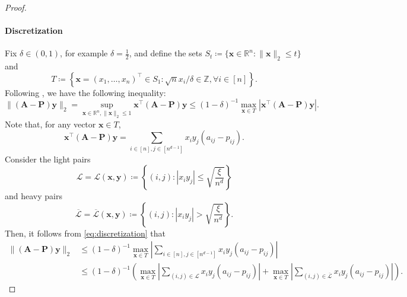 \documentclass{article}
\theoremstyle{plain}
\theoremstyle{definition}
\theoremstyle{remark}
\newcommand{\Br}{\mathbb{R}}
\newcommand{\BP}{\bm{P}}
\newcommand{\BA}{\bm{A}}
\newcommand{\LCal}{\mathcal{L}}
\def\bx{\bm{x}}
\def\by{\bm{y}}
\begin{document}
\begin{appendix}
\begin{center}
\begin{proof}
			\paragraph{Discretization}
			Fix $\delta \in (0,1)$, for example $\delta = \frac{1}{2}$, and define the sets $S_t \coloneqq \{\bx \in \Br^n: \| \bx\|_2 \leq t\}$ and
			\[T \coloneqq \left\{\bx=\left(x_1, \ldots, x_n\right)^\top \in S_1: \sqrt{n} x_i / \delta \in \mathbb{Z}, \forall i\in [n] \right\}.
			\]
			Following \citet[ Supplementary material: Lemma 2.1]{lei2015consistency}, we have the following inequality:
			\begin{equation}\label{eq:discretization}
				\| (\BA - \BP) \by \|_2 = \sup_{\bx \in \Br^n, \| \bx\|_2 \leq 1} \bx^\top (\BA - \BP) \by \leq (1-\delta)^{-1} \max_{\bx \in T} \left|\bx^\top (\BA - \BP) \by \right|.
			\end{equation}
			Note that, for any vector $\bx \in T$,
			\[
			\bx^\top(\BA - \BP) \by=\sum_{i\in [n],  j\in [n^{d-1}]} x_i y_j\left(a_{i j}-p_{i j}\right) .
			\]
			Consider the light pairs
			\[
			\mathcal{L}=\mathcal{L}(\bx, \by) \coloneqq \left\{(i, j):\left|x_i y_j\right| \leq \sqrt{\frac{\xi}{n^{d}}} \right\}
			\]
			and heavy pairs
			\[
			\overline{\mathcal{L}}=\overline{\mathcal{L}}(\bx, \by) \coloneqq \left\{(i, j):\left|x_i y_j\right|>\sqrt{\frac{\xi}{n^{d}}}\right\}.
			\]
			Then, it follows from \eqref{eq:discretization} that
			\begin{align*}
				\| (\BA - \BP) \by \|_2 & \leq (1-\delta)^{-1} \max_{\bx \in T} \left|\sum_{i\in [n],  j\in [n^{d-1}]} x_i y_j\left(a_{i j}-p_{i j}\right) \right| \\
				& \leq (1-\delta)^{-1} \left( \max_{\bx \in T} \left|\sum_{(i,j)\in \LCal}x_i y_j\left(a_{i j}-p_{i j}\right) \right| + \max_{\bx \in T} \left|\sum_{(i,j)\in \overline{\mathcal{L}}}x_i y_j\left(a_{i j}-p_{i j}\right) \right| \right).
			\end{align*}

\end{proof}
\end{center}
\end{appendix}
\end{document}
